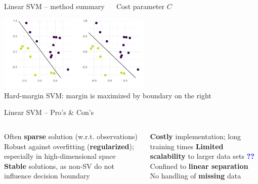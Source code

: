 \begin{vbframe}{Linear SVM -- method summary}
 ~~ Cost parameter \textbf{$C$}

\hfill

\includegraphics[width=0.55\textwidth]{
  ../slides/linear-svm/figure/linear_classif_1.png}  \\
  \tiny{Hard-margin SVM: margin is maximized by boundary on the right}
  \normalsize

\end{vbframe}


\begin{frame}{Linear SVM -- Pro's \& Con's}

\begin{columns}[onlytextwidth]
  \begin{column}{0.5\textwidth}
    \footnotesize
    \begin{itemize}
      \positem Often \textbf{sparse} solution (w.r.t. observations)
      \positem Robust against overfitting (\textbf{regularized}); especially in 
      high-dimensional space
      \positem \textbf{Stable} solutions, as non-SV do not influence decision 
      boundary
    \end{itemize}
  \end{column}

  \begin{column}{0.5\textwidth}
    \footnotesize
    \begin{itemize}
      \negitem \textbf{Costly} implementation; long training times
      \negitem \textbf{Limited scalability} to larger data sets 
      \textcolor{blue}{\textbf{??}}
      \negitem Confined to \textbf{linear separation}
      \negitem No handling of \textbf{missing} data
    \end{itemize}
  \end{column}
\end{columns}

\vfill

\small


\end{frame}

